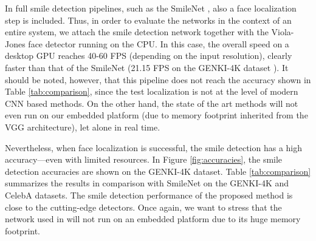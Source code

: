 \documentclass[conference]{IEEEtran}
\begin{document}
In full smile detection pipelines, such as the SmileNet \cite{smilenet}, also a face localization step is included. Thus, in order to evaluate the networks in the context of an entire system, we attach the smile detection network together with the Viola-Jones face detector running on the CPU. In this case, the overall speed on a desktop GPU reaches 40-60 FPS (depending on the input resolution), clearly faster than that of the SmileNet (21.15 FPS on the GENKI-4K dataset \cite{smilenet}). It should be noted, however, that this pipeline does not reach the accuracy shown in Table \ref{tab:comparison}, since the test localization is not at the level of modern CNN based methods. On the other hand, the state of the art methods will not even run on our embedded platform (due to memory footprint inherited from the VGG architecture), let alone in real time.

Nevertheless, when face localization is successful, the smile detection has a high accuracy---even with limited resources. In Figure \ref{fig:accuracies}, the smile detection accuracies are shown on the GENKI-4K dataset. Table \ref{tab:comparison} summarizes the results in comparison with SmileNet on the GENKI-4K and CelebA datasets. The smile detection performance of the proposed method is close to the cutting-edge detectors. Once again, we want to stress that the network used in  \cite{smilenet} will not run on an embedded platform due to its huge memory footprint.




\end{document}
